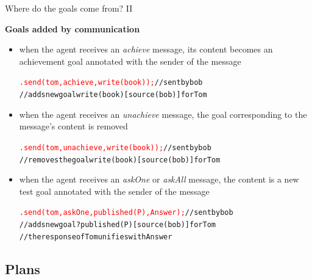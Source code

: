\documentclass[compress]{beamer}
\newcommand{\instruction}[1]{\textcolor{red}{#1}}
\newcommand{\comment}[1]{\textcolor{harvestgold}{#1}}
\begin{document}
\begin{frame}{Where do the goals come from? II}

   
    {\bf Goals added by communication}
    
   
   \begin{itemize}\footnotesize
     \item when the agent receives an \textit{achieve} message, its content becomes an achievement goal {\tiny annotated with the sender of the message}\\
     \begin{alltt}
       \instruction{.send(tom,achieve,write(book));}\comment{//sent by bob}\\      
       \comment{//adds new goal write(book)[source(bob)] for Tom}
     \end{alltt}
     
     \item when the agent receives an \textit{unachieve} message, the goal corresponding to the message's content is removed
     \begin{alltt}
       \instruction{.send(tom,unachieve,write(book));}\comment{//sent by bob}\\      
       \comment{//removes the goal write(book)[source(bob)] for Tom}
     \end{alltt}
    
  

    \item when the agent receives an \textit{askOne} or \textit{askAll} message, the content is a new test goal  {\tiny annotated with the sender of the message}\\
    \begin{alltt}
       \instruction{.send(tom,askOne,published(P),Answer);}\comment{//sent by bob}\\      
       \comment{//adds new goal ?published(P)[source(bob)] for Tom}\\
       \comment{//the response of Tom unifies with Answer}
     \end{alltt}
    \end{itemize} 
\end{frame}





\subsection{Plans}
\end{document}
